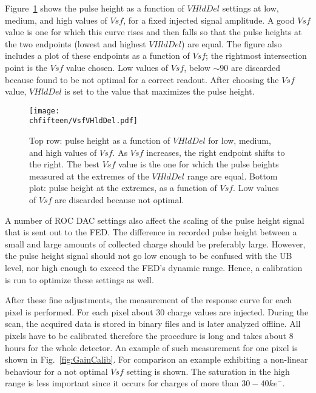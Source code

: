 Figure~\ref{fig:VhldDel} shows the pulse height as a function of $VHldDel$ settings at low, medium, and high values of $Vsf$, for a fixed injected signal amplitude.
A good $Vsf$ value is one for which this curve rises and then falls so that the pulse heights at the two endpoints (lowest and highest $VHldDel$) are equal.
The figure also includes a plot of these endpoints as a function of $Vsf$; the rightmost intersection point is the $Vsf$ value chosen. Low values of $Vsf$, below $\sim 90$ are discarded because found to be not optimal for a correct readout. After choosing the $Vsf$ value, $VHldDel$ is set to the value that maximizes the pulse height.

\begin{figure}[!htb]
\begin{center}
 \texttt{[image: \\chfifteen/VsfVHldDel.pdf]}
 \end{center}
 \caption{Top row: pulse height as a function of $VHldDel$ for low, medium, and high values of $Vsf$. As $Vsf$ increases, the right endpoint shifts to the right.
 The best $Vsf$ value is the one for which the pulse heights measured at the extremes of the $VHldDel$ range are equal.
 Bottom plot: pulse height at the extremes, as a function of $Vsf$. Low values of $Vsf$ are discarded because not optimal.}
 \label{fig:VhldDel}
\end{figure}

A number of ROC DAC settings also affect the scaling of the pulse height signal that is sent out to the FED. The difference in recorded pulse height between a small and large amounts of collected charge should be preferably large.
However, the pulse height signal should not go low enough to be confused with the UB level, nor high enough to exceed the FED's dynamic range.
Hence, a calibration is run to optimize these settings as well.

After these fine adjustments, the measurement of the response curve for each pixel is performed. For each pixel about 30 charge values are injected. 
During the scan, the acquired data is stored in binary files and is later analyzed offline. All pixels have to be calibrated therefore the procedure is long and takes about 8 hours for the whole detector.
An example of such measurement for one pixel is shown in Fig.~\ref{fig:GainCalib}. For comparison an example exhibiting a non-linear behaviour for a not optimal $Vsf$ setting is shown.
The saturation in the high range is less important since it occurs for charges of more than $30-40ke^-$.

